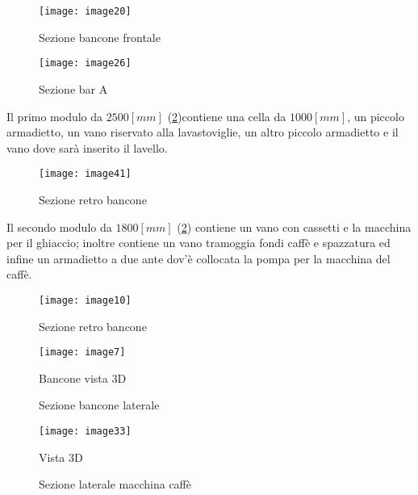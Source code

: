 \begin{figure}[H]
	\centering
	\texttt{[image: image20]}
	\caption{Sezione bancone frontale}
	\label{fig:mesh1}
\end{figure}

\begin{figure}[H]
	\centering
	\texttt{[image: image26]}
	\caption{Sezione bar A}
\end{figure}

\noindent
Il primo modulo da $2500 [mm]$ (\cref{fig:sezioneretrobancone})contiene una cella da $1000 [mm]$, un piccolo armadietto, un vano riservato alla lavastoviglie, un altro piccolo armadietto e il vano dove sarà inserito il lavello.

\begin{figure}[H]
	\centering
	\texttt{[image: image41]}
	\caption{Sezione retro bancone}
\end{figure}

\noindent
Il secondo modulo da $1800 [mm]$ (\cref{fig:sezioneretrobancone}) contiene un vano con cassetti e la macchina per il ghiaccio; inoltre contiene un vano tramoggia fondi caffè e spazzatura ed infine un armadietto a due ante dov'è collocata la pompa per la macchina del caffè.

\begin{figure}[H]
	\centering
	\texttt{[image: image10]}
	\caption{Sezione retro bancone}
	\label{fig:sezioneretrobancone}
\end{figure}
\begin{figure}[H]
	\centering
	\texttt{[image: image7]}
	\caption{Bancone vista 3D}
\end{figure}

\begin{figure}[H]
	\captionsetup[subfloat]{farskip=2pt,captionskip=8pt}
	\centering
	\hspace{1cm}
	
	\caption{Sezione bancone laterale}
	\label{fig:sezione bancone}
\end{figure}

\begin{figure}[H]
	\centering
	\texttt{[image: image33]}
	\caption{Vista 3D}
\end{figure}

\begin{figure}[H]
	\captionsetup[subfloat]{farskip=2pt,captionskip=8pt}
	\centering
	\hspace{1cm}
	
	\caption{Sezione laterale macchina caffè}
	\label{fig:sezionemacchinacaffe}
\end{figure}



